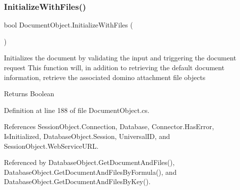 \subsubsection{\texorpdfstring{Initialize\+With\+Files()}{InitializeWithFiles()}}
{\footnotesize\ttfamily bool Document\+Object.\+Initialize\+With\+Files (\begin{DoxyParamCaption}{ }\end{DoxyParamCaption})}



Initializes the document by validating the input and triggering the document request This function will, in addition to retrieving the default document information, retrieve the associated domino attachment file objects 

\begin{DoxyReturn}{Returns}
Boolean
\end{DoxyReturn}


Definition at line 188 of file Document\+Object.\+cs.



References Session\+Object.\+Connection, Database, Connector.\+Has\+Error, Is\+Initialized, Database\+Object.\+Session, Universal\+ID, and Session\+Object.\+Web\+Service\+U\+RL.



Referenced by Database\+Object.\+Get\+Document\+And\+Files(), Database\+Object.\+Get\+Document\+And\+Files\+By\+Formula(), and Database\+Object.\+Get\+Document\+And\+Files\+By\+Key().


